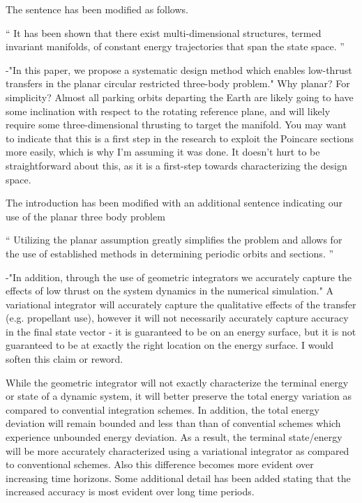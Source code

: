 \documentclass[11pt]{article}
\newenvironment{correction}{\begin{list}{}{\setlength{\leftmargin}{1cm}\setlength{\rightmargin}{1cm}}\vspace{\parsep}\item[]``}{''\end{list}}
\begin{document}
\begin{enumerate}
The sentence has been modified as follows.

\begin{correction}
It has been shown that there exist multi-dimensional structures, termed invariant manifolds, of constant energy trajectories that span the state space. 
\end{correction}

\item 
    \begin{itshape}
-"In this paper, we propose a systematic design method which enables low-thrust transfers in the planar circular restricted three-body problem." Why planar?  For simplicity?  Almost all parking orbits departing the Earth are likely going to have some inclination with respect to the rotating reference plane, and will likely require some three-dimensional thrusting to target the manifold.  You may want to indicate that this is a first step in the research to exploit the Poincare sections more easily, which is why I'm assuming it was done.  It doesn't hurt to be straightforward about this, as it is a first-step towards characterizing the design space.
\end{itshape}

The introduction has been modified with an additional sentence indicating our use of the planar three body problem

\begin{correction}
Utilizing the planar assumption greatly simplifies the problem and allows for the use of established methods in determining periodic orbits and \Poincare sections.
\end{correction}

\item 
    \begin{itshape}
-"In addition, through the use of geometric integrators we accurately capture the effects of low thrust on the system dynamics in the numerical simulation."  A variational integrator will accurately capture the qualitative effects of the transfer (e.g. propellant use), however it will not necessarily accurately capture accuracy in the final state vector - it is guaranteed to be on an energy surface, but it is not guaranteed to be at exactly the right location on the energy surface.  I would soften this claim or reword.
\end{itshape}

While the geometric integrator will not exactly characterize the terminal energy or state of a dynamic system, it will better preserve the total energy variation as compared to convential integration schemes. 
In addition, the total energy deviation will remain bounded and less than than of convential schemes which experience unbounded energy deviation. 
As a result, the terminal state/energy will be more accurately characterized using a variational integrator as compared to conventional schemes. 
Also this difference becomes more evident over increasing time horizons.
Some additional detail has been added stating that the increased accuracy is most evident over long time periods. 


\end{enumerate}
\end{document}
